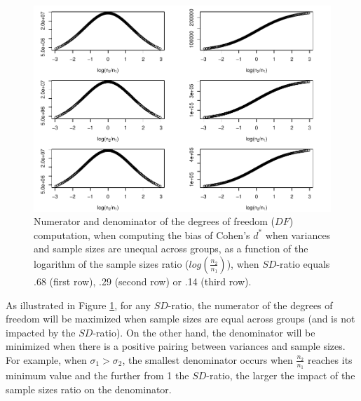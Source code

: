 \documentclass[
  english,
  man,mask]{apa6}
\begin{document}
\begin{figure}
\centering
\includegraphics{SupMat1_files/figure-latex/dfnumdenomcohendprimehetunbalnratiosdratio2-1.pdf}
\caption{\label{fig:dfnumdenomcohendprimehetunbalnratiosdratio2}Numerator and denominator of the degrees of freedom (\(DF\)) computation, when computing the bias of Cohen's \(d^*\) when variances and sample sizes are unequal across groups, as a function of the logarithm of the sample sizes ratio (\(log \left( \frac{n_2}{n_1} \right)\)), when \(SD\)-ratio equals .68 (first row), .29 (second row) or .14 (third row).}
\end{figure}

As illustrated in Figure \ref{fig:dfnumdenomcohendprimehetunbalnratiosdratio2}, for any \(SD\)-ratio, the numerator of the degrees of freedom will be maximized when sample sizes are equal across groups (and is not impacted by the \(SD\)-ratio). On the other hand, the denominator will be minimized when there is a positive pairing between variances and sample sizes. For example, when \(\sigma_1 > \sigma_2\), the smallest denominator occurs when \(\frac{n_2}{n_1}\) reaches its minimum value and the further from 1 the \(SD\)-ratio, the larger the impact of the sample sizes ratio on the denominator.
\end{document}

